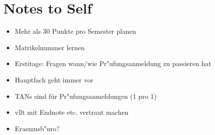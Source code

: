 \documentclass[]{scrartcl}
\begin{document}
\section{Notes to Self}

\begin{itemize}
    \item Mehr als 30 Punkte pro Semester planen
    \item Matrikelnummer lernen
    \item Erstitage: Fragen wann/wie Pr"ufungsanmeldung zu passieren hat
    \item Hauptfach geht immer vor
    \item TANs sind für Pr"ufungsanmeldungen (1 pro 1)
    \item vllt mit Endnote etc. vertraut machen
    \item Erasmusb"uro?
  \end{itemize}
\end{document}
